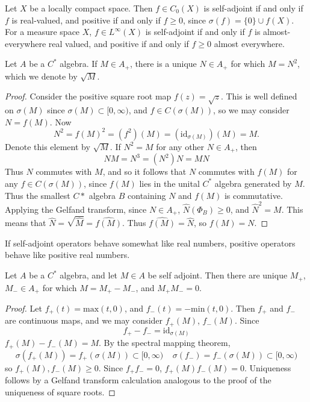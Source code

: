 \begin{example}
    Let $X$ be a locally compact space. Then $f \in C_0(X)$ is self-adjoint if and only if $f$ is real-valued, and positive if and only if $f \geq 0$, since $\sigma(f) = \{ 0 \} \cup f(X)$. For a measure space $X$, $f \in L^\infty(X)$ is self-adjoint if and only if $f$ is almost-everywhere real valued, and positive if and only if $f \geq 0$ almost everywhere.
\end{example}

\begin{prop}
    Let $A$ be a $C^*$ algebra. If $M \in A_+$, there is a unique $N \in A_+$ for which $M = N^2$, which we denote by $\sqrt{M}$.
\end{prop}
\begin{proof}
    Consider the positive square root map $f(z) = \sqrt{z}$. This is well defined on $\sigma(M)$ since $\sigma(M) \subset [0,\infty)$, and $f \in C(\sigma(M))$, so we may consider $N = f(M)$. Now
    \[ N^2 = f(M)^2 = (f^2)(M) = (\text{id}_{\sigma(M)})(M) = M. \]
    Denote this element by $\sqrt{M}$. If $N^2 = M$ for any other $N \in A_+$, then
    \[ NM = N^3 = (N^2)N = MN \]
    Thus $N$ commutes with $M$, and so it follows that $N$ commutes with $f(M)$ for any $f \in C(\sigma(M))$, since $f(M)$ lies in the unital $C^*$ algebra generated by $M$. Thus the smallest $C*$ algebra $B$ containing $N$ and $f(M)$ is commutative. Applying the Gelfand transform, since $N \in A_+$, $\widehat{N}(\Phi_B) \geq 0$, and $\widehat{N}^2 = M$. This means that $\widehat{N} = \sqrt{\widehat{M}} = \widehat{f(M)}$. Thus $\widehat{f(M)} = \widehat{N}$, so $f(M) = N$.
\end{proof}

If self-adjoint operators behave somewhat like real numbers, positive operators behave like positive real numbers.

\begin{prop}
    Let $A$ be a $C^*$ algebra, and let $M \in A$ be self adjoint. Then there are unique $M_+$, $M_- \in A_+$ for which $M = M_+ - M_-$, and $M_+ M_- = 0$.
\end{prop}
\begin{proof}
    Let $f_+(t) = \text{max}(t,0)$, and $f_-(t) = -\text{min}(t,0)$. Then $f_+$ and $f_-$ are continuous maps, and we may consider $f_+(M)$, $f_-(M)$. Since
    \[ f_+ - f_- = \text{id}_{\sigma(M)} \]
    $f_+(M) - f_-(M) = M$. By the spectral mapping theorem,
    \[ \sigma(f_+(M)) = f_+(\sigma(M)) \subset [0,\infty)\ \ \ \ \ \sigma(f_-) = f_-(\sigma(M)) \subset [0,\infty) \]
    so $f_+(M), f_-(M) \geq 0$. Since $f_+ f_- = 0$, $f_+(M) f_-(M) = 0$. Uniqueness follows by a Gelfand transform calculation analogous to the proof of the uniqueness of square roots.
\end{proof}

